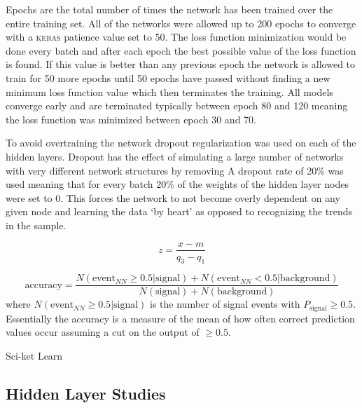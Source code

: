 Epochs are the total number of times the network has been trained over the entire training set.  All of the networks were allowed up to 200 epochs to converge with a \textsc{keras} patience value set to 50.  The loss function minimization would be done every batch and after each epoch the best possible value of the loss function is found.  If this value is better than any previous epoch the network is allowed to train for 50 more epochs until 50 epochs have passed without finding a new minimum loss function value which then terminates the training.  All models converge early and are terminated typically between epoch 80 and 120 meaning the loss function was minimized between epoch 30 and 70.  

To avoid overtraining the network dropout regularization was used on each of the hidden layers.  Dropout has the effect of simulating a large number of networks with very different network structures by removing A dropout rate of 20\% was used meaning that for every batch 20\% of the weights of the hidden layer nodes were set to 0.  This forces the network to not become overly dependent on any given node and learning the data `by heart' as opposed to recognizing the trends in the sample. 

\[ z = \frac{x - m }{q_3 - q_1} \]

\[ \text{accuracy} = \frac{N(\text{event}_{NN} \geq 0.5|\text{signal})+ N(\text{event}_{NN} <0.5|\text{background})}{N(\text{signal})+N(\text{background})} \]
where $N(\text{event}_{NN} \geq 0.5|\text{signal})$ is the number of signal events with $P_{\text{signal}}\geq 0.5$.  Essentially the accuracy is a measure of the mean of how often correct prediction values occur assuming a cut on the output of $\geq0.5$.


Sci-ket Learn \cite{ScikitLearn}
\subsection{Hidden Layer Studies}
